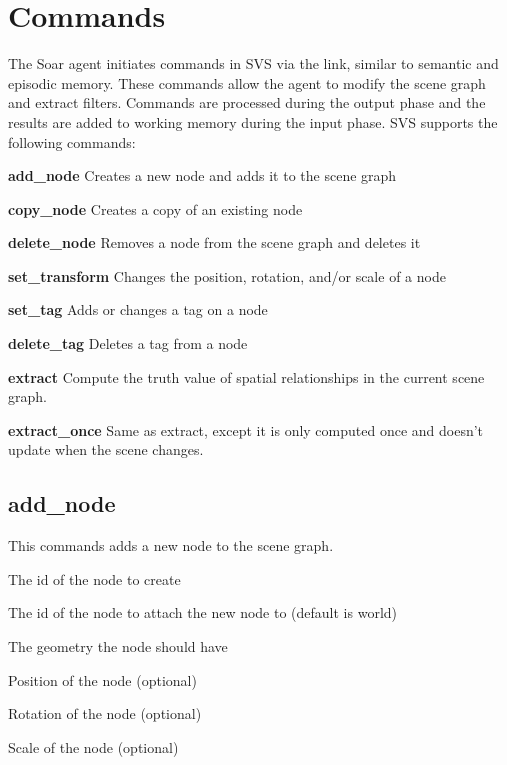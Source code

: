 \section{Commands}

The Soar agent initiates commands in SVS via the  link,
similar to semantic and episodic memory. These commands allow the agent to
modify the scene graph and extract filters.
Commands are processed during the output phase and the results are added to
working memory during the input phase.
SVS supports the following commands:

\begin{description}
	\item{\textbf{add\_node}}
		Creates a new node and adds it to the scene graph
	\item{\textbf{copy\_node}}
		Creates a copy of an existing node
	\item{\textbf{delete\_node}}
		Removes a node from the scene graph and deletes it
	\item{\textbf{set\_transform}}
		Changes the position, rotation, and/or scale of a node
	\item{\textbf{set\_tag}}
		Adds or changes a tag on a node
	\item{\textbf{delete\_tag}}
		Deletes a tag from a node
	\item{\textbf{extract}}
		Compute the truth value of spatial relationships in the current scene graph.
	\item{\textbf{extract\_once}}
		Same as extract, except it is only computed once and doesn't update when the scene changes.
\end{description}


\subsection{add\_node}

This commands adds a new node to the scene graph.

\begin{description}
	\item{} The id of the node to create
	\item{} The id of the node to attach the new node to (default is world)
	\item{} The geometry the node should have
	\item{} Position of the node (optional)
	\item{} Rotation of the node (optional)
	\item{} Scale of the node (optional)
\end{description}


